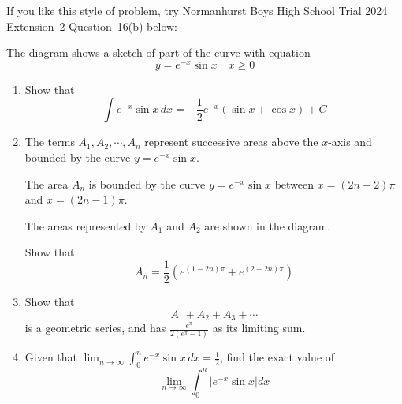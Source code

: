 \begin{remark}
If you like this style of problem, try Normanhurst Boys High School Trial 2024 Extension~2 Question~16(b) below:

\medskip

The diagram shows a sketch of part of the curve with equation
$$ y = e^{-x} \sin x \quad x \ge 0 $$

\begin{center}
\end{center}

\begin{enumerate}[label=(\roman*)]
    \item Show that
    $$ \int e^{-x} \sin x \, dx = -\frac{1}{2} e^{-x} (\sin x + \cos x) + C $$

    \item The terms $A_1, A_2, \cdots, A_n$ represent successive areas above the $x$-axis and bounded by the curve $y = e^{-x} \sin x$.

    The area $A_n$ is bounded by the curve $y = e^{-x} \sin x$ between $x = (2n - 2)\pi$ and $x = (2n - 1)\pi$.

    The areas represented by $A_1$ and $A_2$ are shown in the diagram.

    Show that
    $$ A_n = \frac{1}{2} \left( e^{(1-2n)\pi} + e^{(2-2n)\pi} \right) $$

    \item Show that
    $$ A_1 + A_2 + A_3 + \cdots $$
    is a geometric series, and has $\displaystyle \frac{e^\pi}{2(e^\pi - 1)}$ as its limiting sum.

    \item Given that $\displaystyle \lim_{n \to \infty} \int_0^n e^{-x} \sin x \, dx = \frac{1}{2}$, find the exact value of
    $$ \lim_{n \to \infty} \int_0^n \left| e^{-x} \sin x \right| dx $$
\end{enumerate}
\end{remark}

